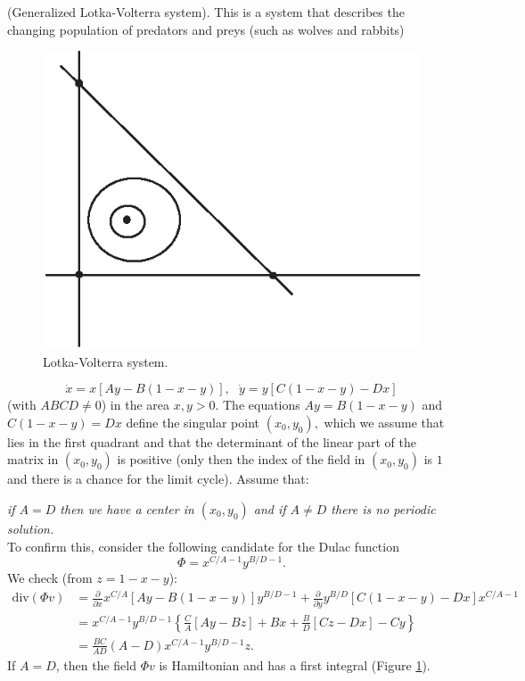 \begin{example}(Generalized Lotka-Volterra system).
	This is a system that describes the changing population of predators and preys (such as wolves and rabbits)
	
	\begin{figure}[!ht]
		\centering
		\includegraphics [scale=1.3]{jtr214}
		\caption{Lotka-Volterra system.}
		\label{fig:2.14}
	\end{figure}
	$$
	\dot{x}=x\left[ Ay-B(1-x-y)\right] ,\text{ \ \ }\dot{y}=y\left[ C(1-x-y)-Dx%
	\right]
	$$
	(with $ ABCD \not = 0 $) in the area $ x, y> 0 $. The equations $ Ay = B (1-x-y) $ and $ C (1-x-y) = Dx $ define the singular point $\left( x_{0},y_{0}\right) ,$ which we assume that lies in the first quadrant and that the determinant of the linear part of the matrix in $\left( x_{0},y_{0}\right) $ is positive (only then the index of the field in $\left( x_{0},y_{0}\right) $ is $ 1 $ and there is a chance for the limit cycle). Assume that:
	
	\textit{if $A = D$ then we have a center in $(x_0, y_0)$ and if $A\not=D$ there is no periodic solution.}\\
	To confirm this, consider the following candidate for the Dulac function
	$$
	\Phi =x^{C/A-1}y^{B/D-1}.
	$$
	We check (from $ z = 1-x-y $):	
	$$
	\begin{array}{ll}
	\text{div} \left( \Phi v\right)& =  \frac{\partial }{\partial x}x^{C/A}%
	\left[ Ay-B(1-x-y)\right] y^{B/D-1}
	+\frac{\partial }{\partial y}y^{B/D}\left[ C(1-x-y)-Dx\right] x^{C/A-1}\\
	& =  x^{C/A-1}y^{B/D-1}\left\{ \frac{C}{A}\left[ Ay-Bz\right] +Bx+\frac{B}{D}%
	\left[ Cz-Dx\right] -Cy\right\}\\
	& =  \frac{BC}{AD}(A-D)x^{C/A-1}y^{B/D-1}z.
	\end{array}
	$$
	If $A=D$, then the field $\Phi v$ is Hamiltonian and has a first integral (Figure \ref{fig:2.14}).
	

\end{example}
